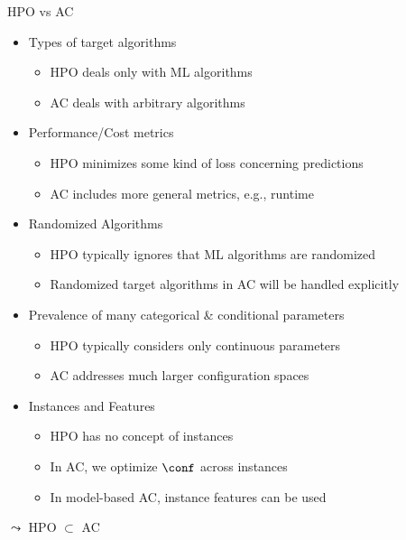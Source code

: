 \begin{frame}[c]{HPO vs AC}

\begin{itemize}
  \item Types of target algorithms 
  \begin{itemize}
    \item HPO deals only with ML algorithms
    \item AC deals with arbitrary algorithms
  \end{itemize}
  \pause
  \item Performance/Cost metrics
  \begin{itemize}
    \item HPO minimizes some kind of loss concerning predictions
    \item AC includes more general metrics, e.g., runtime
  \end{itemize}
  \pause
  \item Randomized Algorithms
  \begin{itemize}
    \item HPO typically ignores that ML algorithms are randomized
    \item Randomized target algorithms in AC will be handled explicitly
  \end{itemize}
  \pause
  \item Prevalence of many categorical \& conditional parameters
  \begin{itemize}
    \item HPO typically considers only continuous parameters
    \item AC addresses much larger configuration spaces
  \end{itemize}
  \pause
  \item Instances and Features
  \begin{itemize}
    \item HPO has no concept of instances
    \item In AC, we optimize $\conf$ across instances
    \item In model-based AC, instance features can be used
  \end{itemize}
\end{itemize}

\pause
\alert{$\leadsto$ HPO $\subset$ AC}

\end{frame}

